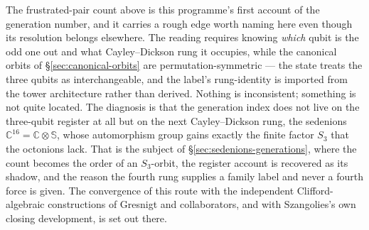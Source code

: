 The frustrated-pair count above is this programme's first account of the generation number, and it
carries a rough edge worth naming here even though its resolution belongs elsewhere. The reading
requires knowing \emph{which} qubit is the odd one out and what Cayley--Dickson rung it occupies,
while the canonical orbits of \S\ref{sec:canonical-orbits} are permutation-symmetric --- the state
treats the three qubits as interchangeable, and the label's rung-identity is imported from the tower
architecture rather than derived. Nothing is inconsistent; something is not quite located. The
diagnosis is that the generation index does not live on the three-qubit register at all but on the
next Cayley--Dickson rung, the sedenions $\mathbb{C}^{16} = \mathbb{C}\otimes\mathbb{S}$, whose
automorphism group gains exactly the finite factor $S_3$ that the octonions lack. That is the subject
of \S\ref{sec:sedenions-generations}, where the count becomes the order of an $S_3$-orbit, the
register account is recovered as its shadow, and the reason the fourth rung supplies a family label
and never a fourth force is given. The convergence of this route with the independent
Clifford-algebraic constructions of Gresnigt and collaborators, and with Szangolies's own closing
development, is set out there.

